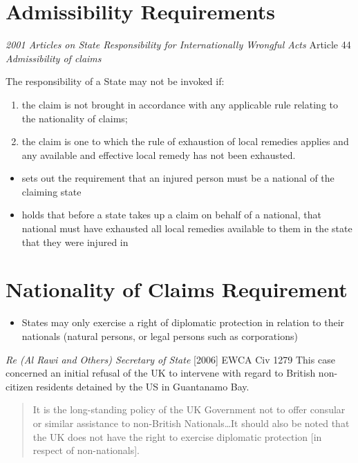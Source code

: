 \section{Admissibility Requirements}
\begin{conventiondetails}{\textit{2001 Articles on State Responsibility for Internationally Wrongful Acts} Article 44}
    \flushleft
    \textit{Admissibility of claims}

    \vspace{\baselineskip}

    The responsibility of a State may not be invoked if:
    \begin{enumerate}[label=(\alph*)]
        \item the claim is not brought in accordance with any applicable rule relating to the nationality of claims; 
        \item the claim is one to which the rule of exhaustion of local remedies applies and any available and effective local remedy has not been exhausted. 
    \end{enumerate}
\end{conventiondetails}

\begin{itemize}
    \item {} sets out the requirement that an injured person must be a national of the claiming state
    \item {} holds that before a state takes up a claim on behalf of a national, that national must have exhausted all local remedies available to them in the state that they were injured in
\end{itemize}

\section{Nationality of Claims Requirement}
\begin{itemize}
    \item States may only exercise a right of diplomatic protection in relation to their nationals (natural persons, or legal persons such as corporations)
\end{itemize}

\begin{casedetails}{\textit{Re (Al Rawi and Others) Secretary of State} [2006] EWCA Civ 1279}
    \flushleft
    This case concerned an initial refusal of the UK to intervene with regard to British non-citizen residents detained by the US in Guantanamo Bay.

    \begin{quote}
        It is the long-standing policy of the UK Government not to offer consular or similar assistance to non-British Nationals…It should also be noted that the UK does not have the right to exercise diplomatic protection [in respect of non-nationals].
    \end{quote}
\end{casedetails}


